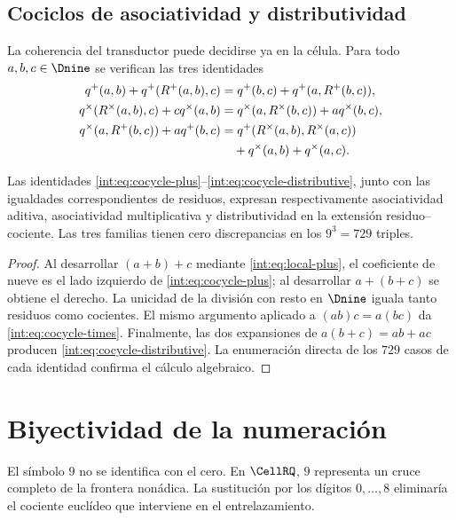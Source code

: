 \subsection{Cociclos de asociatividad y distributividad}

La coherencia del transductor puede decidirse ya en la célula. Para todo
$a,b,c\in\Dnine$ se verifican las tres identidades
\begin{align}
q^+(a,b)+q^+(R^+(a,b),c)
&=q^+(b,c)+q^+(a,R^+(b,c)),\label{int:eq:cocycle-plus}\\
q^\times(R^\times(a,b),c)+cq^\times(a,b)
&=q^\times(a,R^\times(b,c))+aq^\times(b,c),
\label{int:eq:cocycle-times}\\
q^\times(a,R^+(b,c))+aq^+(b,c)
&=q^+(R^\times(a,b),R^\times(a,c))\notag\\
&\quad+q^\times(a,b)+q^\times(a,c).
\label{int:eq:cocycle-distributive}
\end{align}

\begin{theorem}
Las identidades \eqref{int:eq:cocycle-plus}--\eqref{int:eq:cocycle-distributive},
junto con las igualdades correspondientes de residuos, expresan
respectivamente asociatividad aditiva, asociatividad multiplicativa y
distributividad en la extensión residuo--cociente. Las tres familias tienen
cero discrepancias en los $9^3=729$ triples.
\end{theorem}

\begin{proof}
Al desarrollar $(a+b)+c$ mediante \eqref{int:eq:local-plus}, el coeficiente de
nueve es el lado izquierdo de \eqref{int:eq:cocycle-plus}; al desarrollar
$a+(b+c)$ se obtiene el derecho. La unicidad de la división con resto en
$\Dnine$ iguala tanto residuos como cocientes. El mismo argumento aplicado a
$(ab)c=a(bc)$ da \eqref{int:eq:cocycle-times}. Finalmente, las dos expansiones de
$a(b+c)=ab+ac$ producen \eqref{int:eq:cocycle-distributive}. La enumeración
directa de los \(729\) casos de cada identidad confirma el cálculo
algebraico.
\end{proof}

\section{Biyectividad de la numeración}

El símbolo $9$ no se identifica con el cero. En $\CellRQ$, $9$ representa un
cruce completo de la frontera nonádica. La sustitución por los dígitos
$0,\ldots,8$ eliminaría el cociente euclídeo que interviene en el
entrelazamiento.

